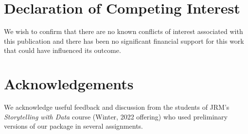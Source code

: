 \documentclass[preprint,12pt,a4paper]{elsarticle}
\begin{document}
\section*{Declaration of Competing Interest}

We wish to confirm that there are no known conflicts of interest
associated with this publication and there has been no significant
financial support for this work that could have influenced its
outcome.


\section*{Acknowledgements}

We acknowledge useful feedback and discussion from the students of
JRM's \textit{Storytelling with Data} course (Winter, 2022 offering)
who used preliminary versions of our package in several assignments.



\end{document}
